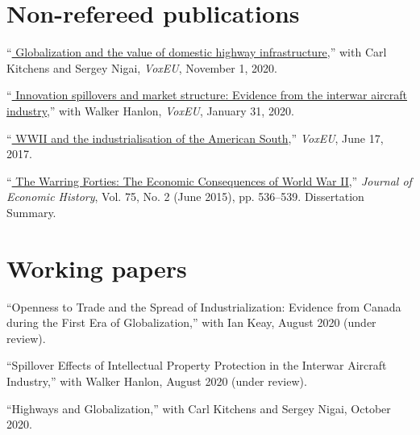 \documentclass[11pt,letterpaper]{article}
\begin{document}
\section*{Non-refereed publications}
\begin{description}[leftmargin=0in,itemsep=.25em,itemindent=.15in]
\item ``\href{https://voxeu.org/article/globalisation-and-value-domestic-highway-infrastructure}{\color{black}
		Globalization and the value of domestic highway infrastructure},''	
		with Carl Kitchens and Sergey Nigai, \emph{VoxEU}, November 1, 2020.
				
\item ``\href{https://voxeu.org/article/innovation-spillovers-and-market-structure}{\color{black}
		Innovation spillovers and market structure: Evidence from the interwar aircraft industry},'' 
		with Walker Hanlon, \emph{VoxEU}, January 31, 2020.
	
\item ``\href{https://voxeu.org/article/wwii-and-industrialisation-american-south}{\color{black}
		WWII and the industrialisation of the American South},'' 
		\emph{VoxEU}, June 17, 2017.	
	
\item 	``\href{https://doi.org/10.1017/S0022050717000791}{\color{black}
			The Warring Forties: The Economic Consequences of World War II},'' 
			\emph{Journal of Economic History}, Vol. 75, No. 2 (June 2015), pp. 536--539. Dissertation Summary.
\end{description}

\vspace{-1em}
\section*{Working papers}

\begin{description}[leftmargin=0in,itemsep=.25em,itemindent=.15in]
\item ``Openness to Trade and the Spread of Industrialization: Evidence from Canada during the First Era of Globalization,'' with Ian Keay, August 2020 (under review).

\item ``Spillover Effects of Intellectual Property Protection in the Interwar Aircraft Industry,'' with Walker Hanlon, August 2020 (under review).

\item ``Highways and Globalization,'' with Carl Kitchens and Sergey Nigai, October 2020.

\end{description} 
\end{document}
